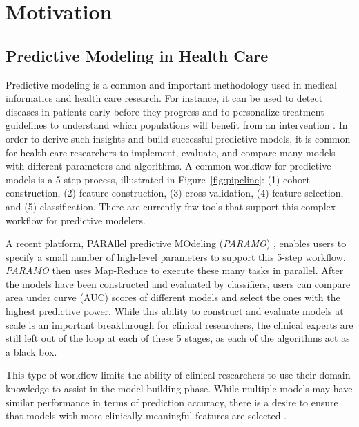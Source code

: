 
\section{Motivation}

\subsection{Predictive Modeling in Health Care}
\label{sec:motivation_healthcare}
Predictive modeling is a common and important methodology used
in medical informatics and health care research.
For instance, it can be used to detect diseases in patients early
before they progress \cite{bellazzi2008predictive} and to
personalize treatment guidelines to understand which populations
will benefit from an intervention \cite{jensen2012mining}.
In order to derive such insights and build successful predictive models,
it is common for health care researchers to implement, evaluate,
and compare many models with different parameters and algorithms.
A common workflow for predictive models is a 5-step process,
illustrated in Figure~\ref{fig:pipeline}:
(1) cohort construction, (2) feature construction, (3) cross-validation,
(4) feature selection, and (5) classification.
There are currently few tools that support this complex
workflow for predictive modelers.

A recent platform, PARAllel predictive MOdeling (\textit{PARAMO}) \cite{paramo},
enables users to specify a small number of high-level parameters
to support this 5-step workflow.
\textit{PARAMO} then uses Map-Reduce to execute these many tasks in parallel.
After the models have been constructed and evaluated by classifiers,
users can compare area under curve (AUC) scores of different models and select the
ones with the highest predictive power.
While this ability to construct and evaluate models at scale is
an important breakthrough for clinical researchers, the clinical
experts are still left out of the loop at each of these 5 stages,
as each of the algorithms act as a black box.

This type of workflow limits the ability of clinical researchers to use
their domain knowledge to assist in the model building phase.
While multiple models may have similar performance in terms of
prediction accuracy, there is a desire to ensure that models
with more clinically meaningful features are selected
\cite{chen2006medical}.

